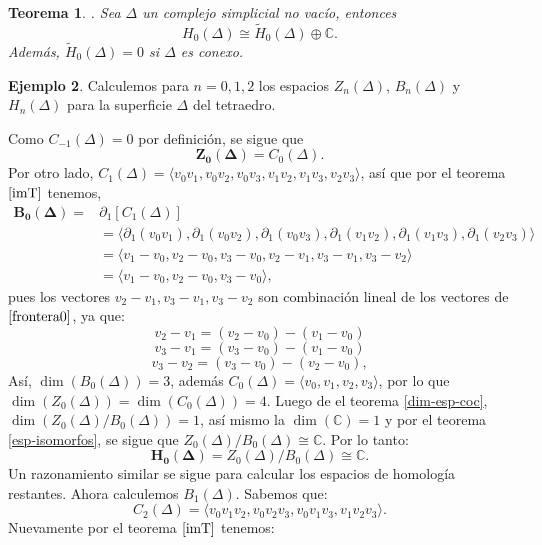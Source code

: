 \documentclass[12pt]{book}
\newtheorem{theorem}{Teorema}[section]
\theoremstyle{definition}
\newtheorem{example}[theorem]{Ejemplo}
\newcounter{in}
\newcounter{ini}
\begin{document}
\begin{theorem}{}.
  Sea $\Delta$ un complejo simplicial no vacío, entonces
  $$H_{0}(\Delta)\cong \widetilde H_{0}(\Delta)\oplus
  \mathbb{C}.$$
  Además, $\widetilde H_{0}(\Delta)=0$ si $\Delta$ es conexo.
\end{theorem}

\begin{example}
  Calculemos para $n=0, 1, 2$ los espacios $Z_{n}(\Delta)$,
  $B_{n}(\Delta)$ y~$H_{n}(\Delta)$ para la superficie $\Delta$ del tetraedro.

  Como $C_{-1}(\Delta)=0$ por definición, se sigue que
  $$\boldsymbol{Z_{0}(\Delta)}=C_{0}(\Delta).$$
  Por otro lado, $C_{1}(\Delta)=\langle v_{0}v_{1},v_{0}v_{2},v_{0}v_{3},v_{1}v_{2},v_{1}v_{3},v_{2}v_{3}\rangle$,
  así que por el teorema $\ref{imT}$ tenemos, 
  \begin{align}
    \label{frontera0}
    \boldsymbol{B_{0}(\Delta)}=&\partial_{1}[C_{1}(\Delta)]\nonumber\\
    &=\langle \partial_{1}(v_{0}v_{1}),\partial_{1}(v_{0}v_{2}),\partial_{1}(v_{0}v_{3}),\partial_{1}(v_{1}v_{2}),\partial_{1}(v_{1}v_{3}),\partial_{1}(v_{2}v_{3})\rangle\nonumber\\
    &=\langle v_{1}-v_{0},v_{2}-v_{0},v_{3}-v_{0},v_{2}-v_{1},v_{3}-v_{1},v_{3}-v_{2}\rangle\nonumber\\
    &=\langle v_{1}-v_{0},v_{2}-v_{0},v_{3}-v_{0}\rangle,
  \end{align} 
  pues los vectores $v_{2}-v_{1}, v_{3}-v_{1}, v_{3}-v_{2}$ son
  combinación lineal de los vectores de $\ref{frontera0}$, ya que:
  $$v_{2}-v_{1}=(v_{2}-v_{0})-(v_{1}-v_{0})$$
  $$v_{3}-v_{1}=(v_{3}-v_{0})-(v_{1}-v_{0})$$
  $$v_{3}-v_{2}=(v_{3}-v_{0})-(v_{2}-v_{0}),$$
  Así, $\dim(B_{0}(\Delta))=3$, además $C_{0}(\Delta)=\langle
  v_{0},v_{1},v_{2},v_{3}\rangle$, por lo que
 $\dim(Z_{0}(\Delta))=\dim(C_{0}(\Delta))=4$. Luego de el teorema
 \ref{dim-esp-coc}, $\dim(Z_{0}(\Delta)/B_{0}(\Delta))=1$, así mismo
 la $\dim(\mathbb{C})=1$ y por el teorema \ref{esp-isomorfos}, se
 sigue que $Z_{0}(\Delta)/B_{0}(\Delta)\cong \mathbb{C}$.
 Por lo tanto:
 $$\boldsymbol{H_{0}(\Delta)}=Z_{0}(\Delta)/B_{0}(\Delta)\cong \mathbb{C}.$$
 Un razonamiento similar se sigue para calcular los espacios de homología restantes.
 Ahora calculemos $B_{1}(\Delta)$. Sabemos que:
 $$C_{2}(\Delta)=\langle
 v_{0}v_{1}v_{2},v_{0}v_{2}v_{3},v_{0}v_{1}v_{3},v_{1}v_{2}v_{3}\rangle.$$
 Nuevamente por el teorema $\ref{imT}$ tenemos:
 \begin{align}  

\end{align}
\end{example}
\end{document}
